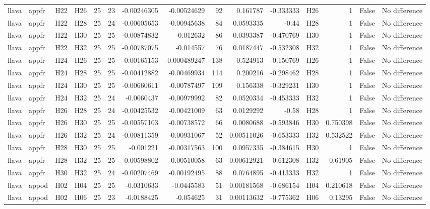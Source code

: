 \begin{longtable}{llllrrrrrrrlrrl}
llava & appfr & H22 & H26 & 25 & 23 & -0.00246305 & -0.00524629 & 92 & 0.161787 & -0.333333 & H26 & 1 & False & No difference \\
llava & appfr & H22 & H28 & 25 & 24 & -0.00605653 & -0.00945638 & 84 & 0.0593335 & -0.44 & H28 & 1 & False & No difference \\
llava & appfr & H22 & H30 & 25 & 25 & -0.00874832 & -0.012632 & 86 & 0.0393387 & -0.470769 & H30 & 1 & False & No difference \\
llava & appfr & H22 & H32 & 25 & 25 & -0.00787075 & -0.014557 & 76 & 0.0187447 & -0.532308 & H32 & 1 & False & No difference \\
llava & appfr & H24 & H26 & 25 & 25 & -0.00165153 & -0.000489247 & 138 & 0.524913 & -0.150769 & H26 & 1 & False & No difference \\
llava & appfr & H24 & H28 & 25 & 25 & -0.00412882 & -0.00469934 & 114 & 0.200216 & -0.298462 & H28 & 1 & False & No difference \\
llava & appfr & H24 & H30 & 25 & 25 & -0.00660611 & -0.00787497 & 109 & 0.156338 & -0.329231 & H30 & 1 & False & No difference \\
llava & appfr & H24 & H32 & 25 & 24 & -0.0060437 & -0.00979992 & 82 & 0.0520334 & -0.453333 & H32 & 1 & False & No difference \\
llava & appfr & H26 & H28 & 25 & 24 & -0.00425532 & -0.00421009 & 63 & 0.0129292 & -0.58 & H28 & 1 & False & No difference \\
llava & appfr & H26 & H30 & 25 & 25 & -0.00557103 & -0.00738572 & 66 & 0.0080688 & -0.593846 & H30 & 0.750398 & False & No difference \\
llava & appfr & H26 & H32 & 25 & 24 & -0.00811359 & -0.00931067 & 52 & 0.00511026 & -0.653333 & H32 & 0.532522 & False & No difference \\
llava & appfr & H28 & H30 & 25 & 25 & -0.001221 & -0.00317563 & 100 & 0.0957335 & -0.384615 & H30 & 1 & False & No difference \\
llava & appfr & H28 & H32 & 25 & 25 & -0.00598802 & -0.00510058 & 63 & 0.00612921 & -0.612308 & H32 & 0.61905 & False & No difference \\
llava & appfr & H30 & H32 & 25 & 24 & -0.00207469 & -0.00192495 & 88 & 0.0764895 & -0.413333 & H32 & 1 & False & No difference \\
llava & appod & H02 & H04 & 25 & 25 & -0.0310633 & -0.0445583 & 51 & 0.00181568 & -0.686154 & H04 & 0.210618 & False & No difference \\
llava & appod & H02 & H06 & 25 & 23 & -0.0188425 & -0.054625 & 31 & 0.00113632 & -0.775362 & H06 & 0.13295 & False & No difference \\

\end{longtable}
